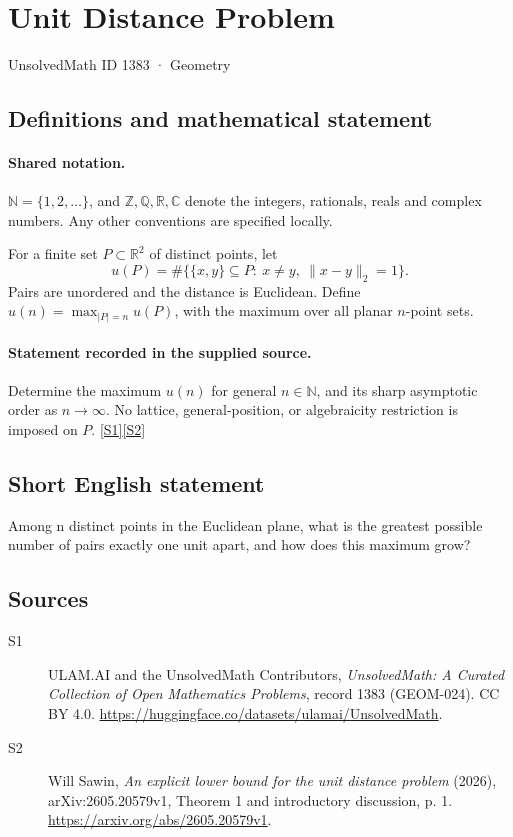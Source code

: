 \documentclass[11pt]{article}
\newcommand{\sref}[2]{\hyperlink{source:#1:#2}{[S#2]}}
\begin{document}
\setcounter{section}{1382}
\section{Unit Distance Problem}\label{1383}
{\small\sffamily UnsolvedMath ID 1383 · Geometry}
\subsection{Definitions and mathematical statement}

\paragraph{Shared notation.}$\mathbb N=\{1,2,\ldots\}$, and $\mathbb Z,\mathbb Q,\mathbb R,\mathbb C$ denote the integers, rationals, reals and complex numbers. Any other conventions are specified locally.


For a finite set $P\subset\mathbb R^2$ of distinct points, let
\[
 u(P)=\#\{\{x,y\}\subseteq P:\ x\ne y,\ \|x-y\|_2=1\}.
\]
Pairs are unordered and the distance is Euclidean. Define $u(n)=\max_{|P|=n}u(P)$, with the maximum over all planar $n$-point sets.
\paragraph{Statement recorded in the supplied source.}
Determine the maximum $u(n)$ for general $n\in\mathbb N$, and its sharp asymptotic order as $n\to\infty$. No lattice, general-position, or algebraicity restriction is imposed on $P$. \sref{1383}{1}\sref{1383}{2}
\subsection{Short English statement}
Among n distinct points in the Euclidean plane, what is the greatest possible number of pairs exactly one unit apart, and how does this maximum grow?
\subsection{Sources}
\begin{description}
\item[\hypertarget{source:1383:1}{S1}] ULAM.AI and the UnsolvedMath Contributors, \emph{UnsolvedMath: A Curated Collection of Open Mathematics Problems}, record 1383 (GEOM-024). CC BY 4.0. \url{https://huggingface.co/datasets/ulamai/UnsolvedMath}.
\item[\hypertarget{source:1383:2}{S2}] Will Sawin, \emph{An explicit lower bound for the unit distance problem} (2026), arXiv:2605.20579v1, Theorem 1 and introductory discussion, p. 1. \url{https://arxiv.org/abs/2605.20579v1}.
\end{description}
\label{end:1383}
\end{document}
